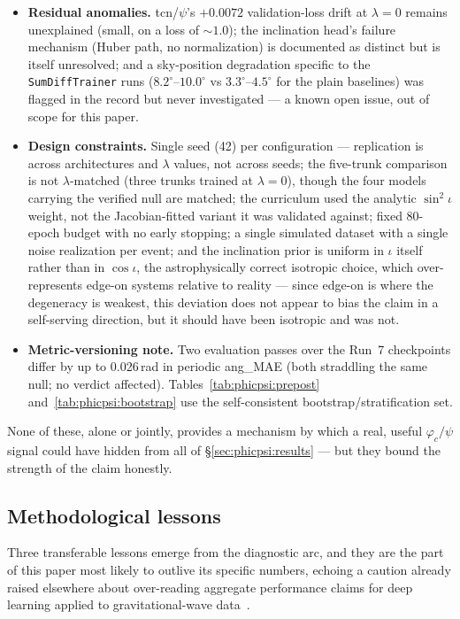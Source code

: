 \documentclass[11pt]{article}
\begin{document}
\begin{itemize}
\item \textbf{Residual anomalies.} tcn/$\psi$'s $+0.0072$ validation-loss drift at $\lambda = 0$ remains unexplained (small, on a loss of ${\sim}1.0$); the inclination head's failure mechanism (Huber path, no normalization) is documented as distinct but is itself unresolved; and a sky-position degradation specific to the \texttt{SumDiffTrainer} runs ($8.2^\circ$--$10.0^\circ$ vs $3.3^\circ$--$4.5^\circ$ for the plain baselines) was flagged in the record but never investigated --- a known open issue, out of scope for this paper.
\item \textbf{Design constraints.}
Single seed (42) per configuration --- replication is across architectures and $\lambda$ values, not across seeds; the five-trunk comparison is not $\lambda$-matched (three trunks trained at $\lambda = 0$), though the four models carrying the verified null are matched; the curriculum used the analytic $\sin^2\iota$ weight, not the Jacobian-fitted variant it was validated against; fixed 80-epoch budget with no early stopping; a single simulated dataset with a single noise realization per event; and the inclination prior is uniform in $\iota$ itself rather than in $\cos\iota$, the astrophysically correct isotropic choice, which over-represents edge-on systems relative to reality --- since edge-on is where the degeneracy is weakest, this deviation does not appear to bias the claim in a self-serving direction, but it should have been isotropic and was not.
\item \textbf{Metric-versioning note.}
Two evaluation passes over the Run~7 checkpoints differ by up to 0.026\,rad in periodic ang\_MAE (both straddling the same null; no verdict affected).
Tables~\ref{tab:phicpsi:prepost} and~\ref{tab:phicpsi:bootstrap} use the self-consistent bootstrap/stratification set.
\end{itemize}
None of these, alone or jointly, provides a mechanism by which a real, useful $\varphi_c/\psi$ signal could have hidden from all of \S\ref{sec:phicpsi:results} --- but they bound the strength of the claim honestly.

\subsection{Methodological lessons}\label{subsec:methodological-lessons}

Three transferable lessons emerge from the diagnostic arc, and they are the part of this paper most likely to outlive its specific numbers, echoing a caution already raised elsewhere about over-reading aggregate performance claims for deep learning applied to gravitational-wave data~\citep{gebhard2019magicbullet}.
\end{document}
